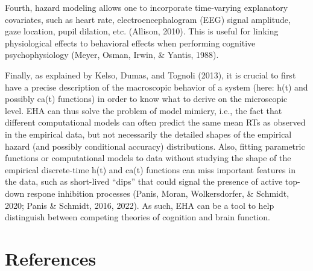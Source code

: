 \documentclass[
  man,floatsintext]{apa6}
\begin{document}
Fourth, hazard modeling allows one to incorporate time-varying explanatory covariates, such as heart rate, electroencephalogram (EEG) signal amplitude, gaze location, pupil dilation, etc. (Allison, 2010). This is useful for linking physiological effects to behavioral effects when performing cognitive psychophysiology (Meyer, Osman, Irwin, \& Yantis, 1988).

Finally, as explained by Kelso, Dumas, and Tognoli (2013), it is crucial to first have a precise description of the macroscopic behavior of a system (here: h(t) and possibly ca(t) functions) in order to know what to derive on the microscopic level. EHA can thus solve the problem of model mimicry, i.e., the fact that different computational models can often predict the same mean RTs as observed in the empirical data, but not necessarily the detailed shapes of the empirical hazard (and possibly conditional accuracy) distributions. Also, fitting parametric functions or computational models to data without studying the shape of the empirical discrete-time h(t) and ca(t) functions can miss important features in the data, such as short-lived ``dips'' that could signal the presence of active top-down respone inhibition processes (Panis, Moran, Wolkersdorfer, \& Schmidt, 2020; Panis \& Schmidt, 2016, 2022). As such, EHA can be a tool to help distinguish between competing theories of cognition and brain function.

\section*{References}\label{references}
\end{document}
